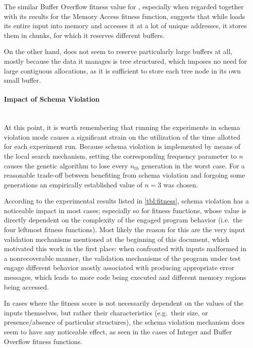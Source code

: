 The similar Buffer Overflow fitness value for \libpng, especially when regarded together with its results for
the Memory Access fitness function, suggests that while \libpng loads its entire input into memory and
accesses it at a lot of unique addresses, it stores them in chunks, for which it reserves different buffers.

On the other hand, \libxml does not seem to reserve particularly large buffers at all, mostly because the data
it manages is tree structured, which imposes no need for large contiguous allocations, as it is sufficient to
store each tree node in its own small buffer.

\paragraph{Impact of Schema Violation} ~\\
At this point, it is worth remembering that running the experiments in schema violation mode causes a
significant strain on the utilization of the time allotted for each experiment run. Because schema violation
is implemented by means of the local search mechanism, setting the corresponding frequency parameter to
$n$ causes the genetic algorithm to lose every $n_{th}$ generation in the worst case. For a
reasonable trade-off between benefiting from schema violation and forgoing some generations an empirically
established value of $n=3$ was chosen.

According to the experimental results listed in \cref{tbl:fitness}, schema violation has a noticeable impact in
most cases; especially so for fitness functions, whose value is directly dependent on the complexity of the
engaged program behavior (i.e.\ the four leftmost fitness functions). Most likely the reason for this are the
very input validation mechanisms mentioned at the beginning of this document, which motivated this work in the
first place: when confronted with inputs malformed in a nonrecoverable manner, the validation mechanisms of the
program under test engage different behavior mostly associated with producing appropriate error messages,
which leads to more code being executed and different memory regions being accessed.

In cases where the fitness score is not necessarily dependent on the values of the inputs themselves, but
rather their characteristics (e.g.\ their size, or presence/absence of particular structures), the schema
violation mechanism does seem to have any noticeable effect, as seen in the cases of Integer and Buffer
Overflow fitness functions.

